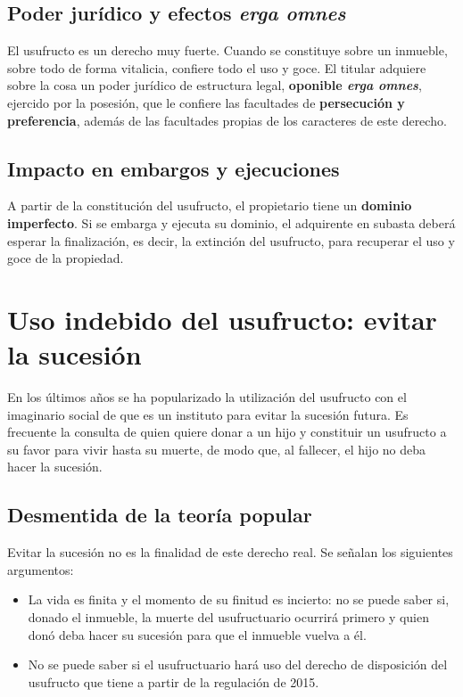 \documentclass[12pt,oneside]{book}
\begin{document}
\subsection{Poder jurídico y efectos \textit{erga omnes}}

El usufructo es un derecho muy fuerte. Cuando se constituye sobre un inmueble, sobre todo de forma vitalicia, confiere todo el uso y goce. El titular adquiere sobre la cosa un poder jurídico de estructura legal, \textbf{oponible \textit{erga omnes}}, ejercido por la posesión, que le confiere las facultades de \textbf{persecución y preferencia}, además de las facultades propias de los caracteres de este derecho.

\subsection{Impacto en embargos y ejecuciones}

A partir de la constitución del usufructo, el propietario tiene un \textbf{dominio imperfecto}. Si se embarga y ejecuta su dominio, el adquirente en subasta deberá esperar la finalización, es decir, la extinción del usufructo, para recuperar el uso y goce de la propiedad.

\section{Uso indebido del usufructo: evitar la sucesión}

En los últimos años se ha popularizado la utilización del usufructo con el imaginario social de que es un instituto para evitar la sucesión futura. Es frecuente la consulta de quien quiere donar a un hijo y constituir un usufructo a su favor para vivir hasta su muerte, de modo que, al fallecer, el hijo no deba hacer la sucesión.

\subsection{Desmentida de la teoría popular}

Evitar la sucesión no es la finalidad de este derecho real. Se señalan los siguientes argumentos:

\begin{itemize}
    \item La vida es finita y el momento de su finitud es incierto: no se puede saber si, donado el inmueble, la muerte del usufructuario ocurrirá primero y quien donó deba hacer su sucesión para que el inmueble vuelva a él.
    \item No se puede saber si el usufructuario hará uso del derecho de disposición del usufructo que tiene a partir de la regulación de 2015.
\end{itemize}
\end{document}
